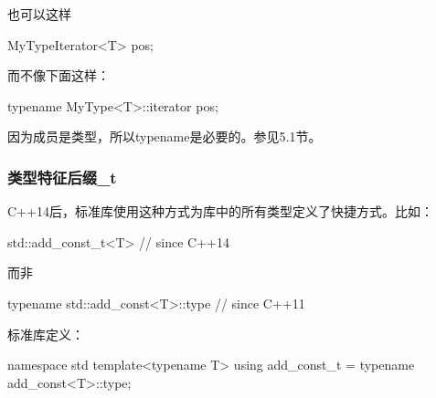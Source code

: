 也可以这样

\begin{cpp}
MyTypeIterator<T> pos;
\end{cpp}

而不像下面这样：

\begin{cpp}
typename MyType<T>::iterator pos;
\end{cpp}

\begin{notice}
因为成员是类型，所以typename是必要的。参见5.1节。
\end{notice}

\subsubsection{类型特征后缀\_t}

C++14后，标准库使用这种方式为库中的所有类型定义了快捷方式。比如：

\begin{cpp}
std::add_const_t<T> // since C++14
\end{cpp}

而非

\begin{cpp}
typename std::add_const<T>::type // since C++11
\end{cpp}

标准库定义：

\begin{cpp}
namespace std {
	template<typename T> using add_const_t = typename add_const<T>::type;
}
\end{cpp}




